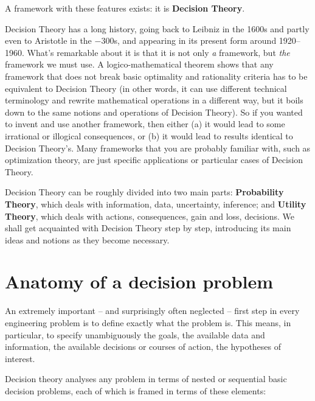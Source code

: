 \documentclass[
  a4paper,
  DIV=11,
  numbers=noendperiod,
  oneside]{scrreprt}
\begin{document}
A framework with these features exists: it is {\textbf{Decision
Theory}}.

Decision Theory has a long history, going back to Leibniz in the 1600s
and partly even to Aristotle in the −300s, and appearing in its present
form around 1920--1960. What's remarkable about it is that it is not
only \emph{a} framework, but \emph{the} framework we must use. A
logico-mathematical theorem shows that any framework that does not break
basic optimality and rationality criteria has to be equivalent to
Decision Theory (in other words, it can use different technical
terminology and rewrite mathematical operations in a different way, but
it boils down to the same notions and operations of Decision Theory). So
if you wanted to invent and use another framework, then either (a) it
would lead to some irrational or illogical consequences, or (b) it would
lead to results identical to Decision Theory's. Many frameworks that you
are probably familiar with, such as optimization theory, are just
specific applications or particular cases of Decision Theory.

Decision Theory can be roughly divided into two main parts:
{\textbf{Probability Theory}}, which deals with information, data,
uncertainty, inference; and {\textbf{Utility Theory}}, which deals with
actions, consequences, gain and loss, decisions. We shall get acquainted
with Decision Theory step by step, introducing its main ideas and
notions as they become necessary.

\hypertarget{anatomy-of-a-decision-problem}{%
\section{Anatomy of a decision
problem}\label{anatomy-of-a-decision-problem}}

An extremely important -- and surprisingly often neglected -- first step
in every engineering problem is to define exactly what the problem is.
This means, in particular, to specify unambiguously the goals, the
available data and information, the available decisions or courses of
action, the hypotheses of interest.

Decision theory analyses any problem in terms of nested or sequential
basic decision problems, each of which is framed in terms of these
elements:

\end{document}
